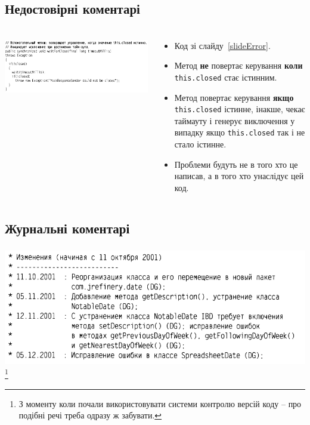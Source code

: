\documentclass[12pt,pdf,utf8,ukrainian,aspectratio=169]{beamer}
\makeatletter
\newcommand*{\currentname}{\@currentlabelname}
\makeatother
\begin{document}
	\subsection{Недостовірні коментарі}
	\begin{frame}\frametitle{\currentname}
		\begin{columns}
			\begin{column}{8cm}
				\includegraphics[scale=0.3]{clean_code_10.png}
			\end{column}
			\begin{column}{7cm} 
				\small
				\begin{itemize}
					\item Код зі слайду~\ref{slideError}. \pause
					\item Метод \textbf{не} повертає керування \textbf{коли} \texttt{this.closed} стає істинним. \pause
					\item Метод повертає керування \textbf{якщо} \texttt{this.closed} істинне, інакше, чекає таймауту і генерує виключення у випадку якщо \texttt{this.closed} так і не стало істинне. \pause
					\item Проблеми будуть не в того хто це написав, а в того хто унаслідує цей код.
				\end{itemize}
			\end{column}
		\end{columns}	
	\end{frame}	
	
	
	\subsection{Журнальні коментарі}
	\begin{frame}[label={slideError}]\frametitle{\currentname}
		\includegraphics[scale=0.5]{clean_code_12.png}
		\footnote{З моменту коли почали використовувати системи контролю версій коду -- про подібні речі треба одразу ж забувати.}
		\hfill
	\end{frame}	
\end{document}
